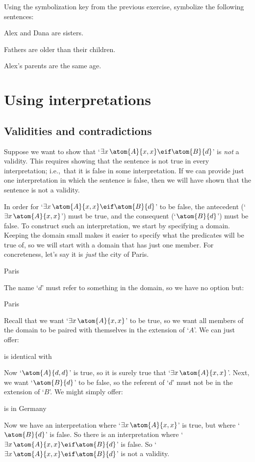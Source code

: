 \problempart
Using the symbolization key from the previous
exercise, symbolize the following sentences:
\begin{compactlist}
	\item Alex and Dana are sisters.
	\item Fathers are older than their children.
	\item Alex's parents are the same age.
\end{compactlist}


\chapter{Using interpretations}
\label{sec.UsingModels}

\section{Validities and contradictions}
Suppose we want to show that `$\exists x\, \atom{A}{x,x} \eif \atom{B}{d}$' is \emph{not} a validity. This requires showing that the sentence is not true in every interpretation; i.e.,\ that it is false in some interpretation. If we can provide just one interpretation in which the sentence is false, then we will have shown that the sentence is not a validity.

In order for `$\exists x\,\atom{A}{x,x} \eif \atom{B}{d}$' to be false, the antecedent (`$\exists x\, \atom{A}{x,x}$') must be true, and the consequent (`$\atom{B}{d}$') must be false. To construct such an interpretation, we start by specifying a domain. Keeping the domain small makes it easier to specify what the predicates will be true of, so we will start with a domain that has just one member. For concreteness, let's say it is \emph{just} the city of Paris.
	\begin{ekey}
		\item[\text{domain}] Paris
	\end{ekey}
The name `$d$' must refer to something in the domain, so we have no option but:
	\begin{ekey}
		\item[d] Paris
	\end{ekey}
Recall that we want `$\exists x\, \atom{A}{x,x}$' to be true, so we want all members of the domain to be paired with themselves in the extension of `$A$'. We can just offer:
	\begin{ekey}
		\item[\atom{A}{x,y}]  is identical with 
	\end{ekey}
Now `$\atom{A}{d,d}$' is true, so it is surely true that `$\exists x\, \atom{A}{x,x}$'. Next, we want `$\atom{B}{d}$' to be false, so the referent of `$d$' must not be in the extension of `$B$'. We might simply offer:
	\begin{ekey}
		\item[\atom{B}{x}]  is in Germany
	\end{ekey}
Now we have an interpretation where `$\exists x\, \atom{A}{x,x}$' is true, but where `$\atom{B}{d}$' is false. So there is an interpretation where `$\exists x\, \atom{A}{x,x} \eif \atom{B}{d}$' is false. So `$\exists x\, \atom{A}{x,x} \eif \atom{B}{d}$' is not a validity.

